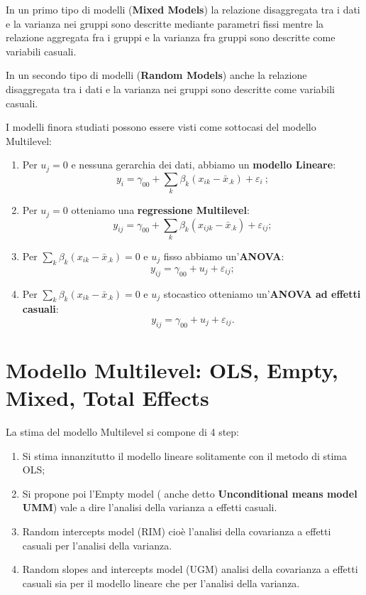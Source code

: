 \documentclass[a4page, 11pt]{article} %
\begin{document}
In un primo tipo di modelli (\textbf{Mixed Models}) la relazione disaggregata tra i dati e la varianza nei gruppi sono descritte mediante parametri fissi mentre la relazione aggregata fra i gruppi e la varianza fra gruppi sono descritte come variabili casuali.

In un secondo tipo di modelli (\textbf{Random Models}) anche la relazione disaggregata tra i dati e la varianza nei gruppi sono descritte come variabili casuali.

I modelli finora studiati possono essere visti come sottocasi del modello Multilevel:
\begin{enumerate}
\item Per $u_j=0$ e nessuna gerarchia dei dati, abbiamo un  \textbf{modello Lineare}: 
\begin{equation*}
y_i= \gamma_{00}+\sum_k \beta_k(x_{ik}-\bar{x}_{.k}) + \varepsilon_i \ ;
\end{equation*}
\item Per $u_j=0$ otteniamo una \textbf{regressione Multilevel}: 
\begin{equation*}
y_{ij} = \gamma_{00} + \sum_k \beta_k(x_{ijk}-\bar{x}_{.k}) + \varepsilon_{ij};
\end{equation*}
\item Per $\sum_k \beta_k (x_{ik} - \bar{x}_{.k}) = 0$ e $u_j$ fisso abbiamo un'\textbf{ANOVA}: 
\begin{equation*}
y_{ij} = \gamma_{00}+ u_j + \varepsilon_{ij};
\end{equation*}
\item Per $\sum_k\beta_k(x_{ik}- \bar{x}_{.k}) = 0$ e $u_j$ stocastico otteniamo un'\textbf{ANOVA ad effetti casuali}: 
\begin{equation*}
y_{ij} = \gamma_{00} + u_j + \varepsilon_{ij}.
\end{equation*}
\end{enumerate}
\section{Modello Multilevel: OLS, Empty, Mixed, Total Effects}

La stima del modello Multilevel si compone di 4 step:
\begin{enumerate}[noitemsep]
\item Si stima innanzitutto il modello lineare solitamente con il metodo di stima OLS;
\item Si propone poi l'Empty model ( anche detto \textbf{Unconditional means model UMM}) vale a dire l’analisi della varianza a effetti casuali.
\item Random intercepts model (RIM) cioè l’analisi della covarianza a effetti casuali per l’analisi della varianza.
\item Random slopes and intercepts model (UGM) analisi della covarianza a effetti casuali sia per il modello lineare che per l’analisi della varianza.
\end{enumerate}
\end{document}
